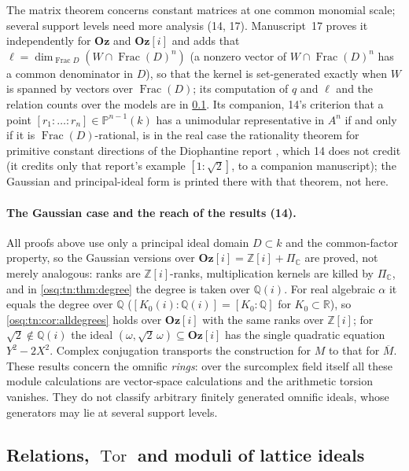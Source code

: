 \documentclass[11pt,letterpaper]{article}
\numberwithin{equation}{section}
\theoremstyle{definition}
\theoremstyle{remark}
\theoremstyle{plain}
\newcommand{\Oz}{\mathbf{Oz}}
\newcommand{\GOz}{\Oz[i]}
\newcommand{\Z}{\mathbb Z}
\newcommand{\Q}{\mathbb Q}
\newcommand{\R}{\mathbb R}
\newcommand{\C}{\mathbb C}
\newcommand{\Frac}{\operatorname{Frac}}
\newcommand{\Tor}{\operatorname{Tor}}
\begin{document}
The matrix theorem concerns constant matrices at one common monomial scale; several support levels need more analysis (14, 17).
Manuscript~17 proves it independently for $\Oz$ and $\GOz$ and adds that $\ell=\dim_{\Frac D}(W\cap\Frac(D)^n)$ (a nonzero vector of
$W\cap\Frac(D)^n$ has a common denominator in $D$), so that the kernel is set-generated exactly when $W$ is spanned by vectors over
$\Frac(D)$; its computation of $q$ and $\ell$ and the relation counts over the models are in \cref{osq:rel:sub:relations}. Its companion,
14's criterion that a point $[r_1:\dots:r_n]\in\mathbb P^{n-1}(k)$ has a unimodular representative in $A^n$ if and only if it is
$\Frac(D)$-rational, is in the real case the rationality theorem for primitive constant directions of the Diophantine report
\cite{RepoOdg}, which 14 does not credit (it credits only that report's example $[1:\sqrt2]$, to a companion manuscript); the Gaussian and
principal-ideal form is printed there with that theorem, not here.

\paragraph{The Gaussian case and the reach of the results (14).} All proofs above use only a principal ideal domain $D\subset k$ and the
common-factor property, so the Gaussian versions over $\GOz=\Z[i]+\Pi_\C$ are proved, not merely analogous: ranks are $\Z[i]$-ranks,
multiplication kernels are killed by $\Pi_\C$, and in \cref{osq:tn:thm:degree} the degree is taken over $\Q(i)$. For real algebraic $\alpha$ it
equals the degree over $\Q$ ($[K_0(i):\Q(i)]=[K_0:\Q]$ for $K_0\subset\R$), so \cref{osq:tn:cor:alldegrees} holds over $\GOz$ with the same
ranks over $\Z[i]$; for $\sqrt2\notin\Q(i)$ the ideal $(\omega,\sqrt2\,\omega)\subseteq\GOz$ has the single quadratic equation $Y^2-2X^2$.
Complex conjugation transports the construction for $M$ to that for $\overline M$. These results concern the omnific \emph{rings}: over the
surcomplex field itself all these module calculations are vector-space calculations and the arithmetic torsion vanishes. They do not classify
arbitrary finitely generated omnific ideals, whose generators may lie at several support levels.


\subsection{Relations, \texorpdfstring{$\Tor$}{Tor} and moduli of lattice ideals}\label{osq:rel:sub:relations}
\end{document}
